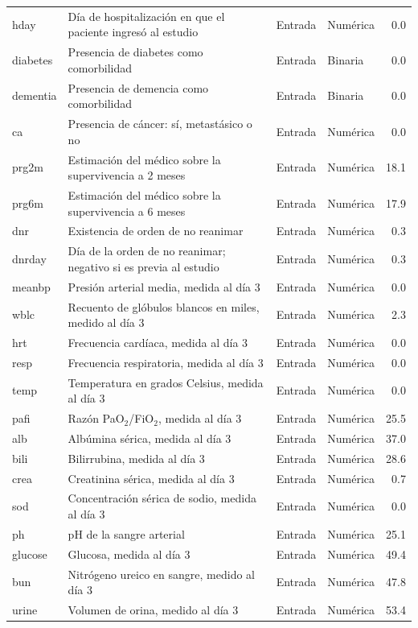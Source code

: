 \begin{longtable}{p{1.7cm} p{5.1cm} p{1.4cm} p{1.6cm} r}
hday & Día de hospitalización en que el paciente ingresó al estudio & Entrada & Numérica & 0.0 \\
diabetes & Presencia de diabetes como comorbilidad & Entrada & Binaria & 0.0 \\
dementia & Presencia de demencia como comorbilidad & Entrada & Binaria & 0.0 \\
ca & Presencia de cáncer: sí, metastásico o no & Entrada & Numérica & 0.0 \\
prg2m & Estimación del médico sobre la supervivencia a 2 meses & Entrada & Numérica & 18.1 \\
prg6m & Estimación del médico sobre la supervivencia a 6 meses & Entrada & Numérica & 17.9 \\
dnr & Existencia de orden de no reanimar & Entrada & Numérica & 0.3 \\
dnrday & Día de la orden de no reanimar; negativo si es previa al estudio & Entrada & Numérica & 0.3 \\
meanbp & Presión arterial media, medida al día 3 & Entrada & Numérica & 0.0 \\
wblc & Recuento de glóbulos blancos en miles, medido al día 3 & Entrada & Numérica & 2.3 \\
hrt & Frecuencia cardíaca, medida al día 3 & Entrada & Numérica & 0.0 \\
resp & Frecuencia respiratoria, medida al día 3 & Entrada & Numérica & 0.0 \\
temp & Temperatura en grados Celsius, medida al día 3 & Entrada & Numérica & 0.0 \\
pafi & Razón PaO$_2$/FiO$_2$, medida al día 3 & Entrada & Numérica & 25.5 \\
alb & Albúmina sérica, medida al día 3 & Entrada & Numérica & 37.0 \\
bili & Bilirrubina, medida al día 3 & Entrada & Numérica & 28.6 \\
crea & Creatinina sérica, medida al día 3 & Entrada & Numérica & 0.7 \\
sod & Concentración sérica de sodio, medida al día 3 & Entrada & Numérica & 0.0 \\
ph & pH de la sangre arterial & Entrada & Numérica & 25.1 \\
glucose & Glucosa, medida al día 3 & Entrada & Numérica & 49.4 \\
bun & Nitrógeno ureico en sangre, medido al día 3 & Entrada & Numérica & 47.8 \\
urine & Volumen de orina, medido al día 3 & Entrada & Numérica & 53.4 \\

\end{longtable}
